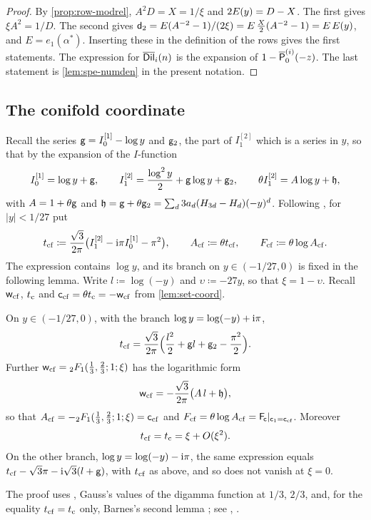 \begin{proof}
By \cref{prop:row-modrel}, $A^2D=X=1/\xi$ and $2E(y)=D-X$. The first gives $\xi A^2=1/D$. The second gives $\mathsf{d}_{2}=E(A^{-2}-1)/(2\xi)=E\,\frac X2(A^{-2}-1)=E\,E(y)$, and $E=e_1(\alpha^*)$. Inserting these in the definition of the rows gives the first statements. The expression for $\overline{\mathsf{Dil}}_i(n)$ is the expansion of $1-\overline{\mathsf{P}}_0^{(i)}(-z)$. The last statement is \cref{lem:spe-numden} in the present notation.
\end{proof}

\subsection{The conifold coordinate}

Recall the series $\mathsf{g}=I_0^{[1]}-\log y$ and $\mathsf{g}_{2}$, the part of $I_1^{[2]}$ which is a series in $y$, so that by the expansion of the $I$-function
\[
I_0^{[1]}=\log y+\mathsf{g},\qquad I_1^{[2]}=\frac{\log^2y}{2}+\mathsf{g}\log y+\mathsf{g}_{2},\qquad\theta I_1^{[2]}=A\log y+\mathfrak{h},
\]
with $A=1+\theta\mathsf{g}$ and $\mathfrak{h}=\mathsf{g}+\theta\mathsf{g}_{2}=\sum_d3a_d(H_{3d}-H_d)(-y)^d$. Following \cite{BS}, for $|y|<1/27$ put
\[
t_{\mathrm{cf}}\coloneqq\frac{\sqrt3}{2\pi}\big(I_1^{[2]}-\mathrm{i}\pi I_0^{[1]}-\pi^2\big),\qquad A_{\mathrm{cf}}\coloneqq\theta t_{\mathrm{cf}},\qquad F_{\mathrm{cf}}\coloneqq\theta\log A_{\mathrm{cf}}.
\]
The expression contains $\log y$, and its branch on $y\in(-1/27,0)$ is fixed in the following lemma. Write $l\coloneqq\log(-y)$ and $\upsilon\coloneqq-27y$, so that $\xi=1-\upsilon$. Recall $\mathsf{w}_{\mathrm{cf}}$, $t_{\mathrm{c}}$ and $\mathsf{c}_{\mathrm{cf}}=\theta t_{\mathrm{c}}=-\mathsf{w}_{\mathrm{cf}}$ from \cref{lem:set-coord}.

\begin{lem}
\label{lem:fra-tcf}
On $y\in(-1/27,0)$, with the branch $\log y=\log(-y)+\mathrm{i}\pi$,
\[
t_{\mathrm{cf}}=\frac{\sqrt3}{2\pi}\Big(\frac{l^2}{2}+\mathsf{g} l+\mathsf{g}_{2}-\frac{\pi^2}{2}\Big).
\]
Further $\mathsf{w}_{\mathrm{cf}}={}_2F_1(\tfrac13,\tfrac23;1;\xi)$ has the logarithmic form
\begin{equation}
\label{eq:fra-log}
\mathsf{w}_{\mathrm{cf}}=-\frac{\sqrt3}{2\pi}\big(A\,l+\mathfrak{h}\big),
\end{equation}
so that $A_{\mathrm{cf}}=-{}_2F_1(\tfrac13,\tfrac23;1;\xi)=\mathsf{c}_{\mathrm{cf}}$ and $F_{\mathrm{cf}}=\theta\log A_{\mathrm{cf}}=\mathsf{F}_{\!\mathsf{c}}|_{\mathsf{c}_{1}=\mathsf{c}_{\mathrm{cf}}}$. Moreover
\[
t_{\mathrm{cf}}=t_{\mathrm{c}}=\xi+O(\xi^2).
\]
On the other branch, $\log y=\log(-y)-\mathrm{i}\pi$, the same expression equals $t_{\mathrm{cf}}-\sqrt3\pi-\mathrm{i}\sqrt3(l+\mathsf{g})$, with $t_{\mathrm{cf}}$ as above, and so does not vanish at $\xi=0$.
\end{lem}

The proof uses \cite[Eq.~15.6.7]{DLMF}, Gauss's values of the digamma function at $1/3$, $2/3$, and, for the equality $t_{\mathrm{cf}}=t_{\mathrm{c}}$ only, Barnes's second lemma \cite{Bar10}; see \cite[Section~6.2]{Bai35}, \cite[Theorem~2.4.3]{AAR99}.

